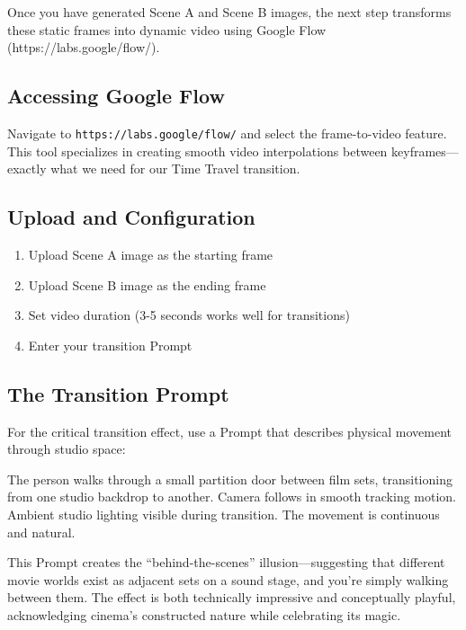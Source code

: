 Once you have generated Scene A and Scene B images, the next step transforms these static frames into dynamic video using Google Flow (https://labs.google/flow/).

\subsection{Accessing Google Flow}

Navigate to \texttt{https://labs.google/flow/} and select the frame-to-video feature. This tool specializes in creating smooth video interpolations between keyframes—exactly what we need for our Time Travel transition.

\subsection{Upload and Configuration}

\begin{enumerate}
\item Upload Scene A image as the starting frame
\item Upload Scene B image as the ending frame
\item Set video duration (3-5 seconds works well for transitions)
\item Enter your transition Prompt
\end{enumerate}

\subsection{The Transition Prompt}

For the critical transition effect, use a Prompt that describes physical movement through studio space:

\begin{Prompt}
The person walks through a small partition door between film sets, transitioning from one studio backdrop to another. Camera follows in smooth tracking motion. Ambient studio lighting visible during transition. The movement is continuous and natural.
\end{Prompt}

This Prompt creates the ``behind-the-scenes'' illusion—suggesting that different movie worlds exist as adjacent sets on a sound stage, and you're simply walking between them. The effect is both technically impressive and conceptually playful, acknowledging cinema's constructed nature while celebrating its magic.

